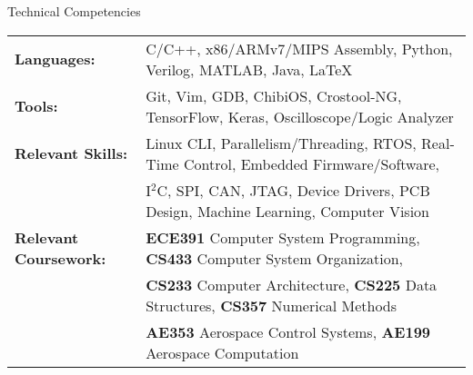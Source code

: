 \documentclass{resume} %
\begin{document}

    \begin{rSection} {Technical Competencies}

        \begin{tabular}{ @{} >{\bfseries}l @{\hspace{2ex}} l }

        Languages: & C/C++, x86/ARMv7/MIPS Assembly, Python, Verilog, MATLAB, Java, LaTeX \\
        Tools: & Git, Vim, GDB, ChibiOS, Crostool-NG, TensorFlow, Keras, Oscilloscope/Logic Analyzer \\
        Relevant Skills: & Linux CLI, Parallelism/Threading, RTOS, Real-Time Control, Embedded Firmware/Software, \\ & I$^2$C, SPI, CAN, JTAG, Device Drivers, PCB Design, Machine Learning, Computer Vision \\
		Relevant Coursework: & \textbf{ECE391} Computer System Programming, \textbf{CS433} Computer System Organization,\\ & \textbf{CS233} Computer Architecture, \textbf{CS225} Data Structures, \textbf{CS357} Numerical Methods \\ & \textbf{AE353} Aerospace Control Systems, \textbf{AE199} Aerospace Computation

        \end{tabular}

    \end{rSection}

\end{document}
